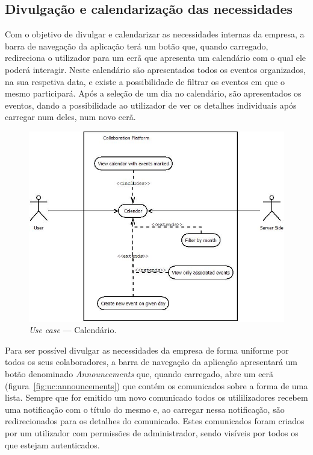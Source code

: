 \subsection{Divulgação e calendarização das necessidades}

Com o objetivo de divulgar e calendarizar as necessidades internas da empresa, a barra de navegação da aplicação terá um botão que, quando carregado, 
redireciona o utilizador para um ecrã que apresenta um calendário com o qual ele poderá interagir. 
Neste calendário são apresentados todos os eventos organizados, na sua respetiva data, e existe a possibilidade de filtrar os eventos em que o mesmo participará. 
Após a seleção de um dia no calendário, são apresentados os eventos, dando a possibilidade ao utilizador de ver os detalhes individuais após carregar num deles, 
num novo ecrã.

\begin{figure}[H]
    \centering
    \includegraphics[scale=0.6]{figures/Calendar use case.jpeg}
    \caption{\textit{Use case} --- Calendário.}\label{fig:uc:calendar}
\end{figure}

Para ser possível divulgar as necessidades da empresa de forma uniforme por todos os seus colaboradores, a barra de navegação da aplicação apresentará 
um botão denominado \textit{Announcements} que, quando carregado, abre um ecrã  (figura~\ref{fig:uc:announcements}) que contém os comunicados sobre a forma de uma lista. 
Sempre que for emitido um novo comunicado todos os utililizadores recebem uma notificação com o título do mesmo e, ao carregar nessa notificação, são redirecionados para os detalhes do comunicado. 
Estes comunicados foram criados por um utilizador com permissões de administrador, sendo visíveis por todos os que estejam autenticados.

